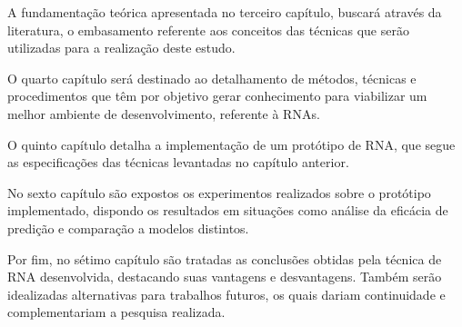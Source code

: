 A fundamentação teórica apresentada no terceiro capítulo, buscará através da literatura, o embasamento referente aos conceitos das técnicas que serão utilizadas para a realização deste estudo.

O quarto capítulo será destinado ao detalhamento de métodos, técnicas e procedimentos que têm por objetivo gerar conhecimento para viabilizar um melhor ambiente de desenvolvimento, referente à RNAs.

O quinto capítulo detalha a implementação de um protótipo de RNA, que segue as especificações das técnicas levantadas no capítulo anterior.

No sexto capítulo são expostos os experimentos realizados sobre o protótipo implementado, dispondo os resultados em situações como análise da eficácia de predição e comparação a modelos distintos.

Por fim, no sétimo capítulo são tratadas as conclusões obtidas pela técnica de RNA desenvolvida, destacando suas vantagens e desvantagens. Também serão idealizadas alternativas para trabalhos futuros, os quais dariam continuidade e complementariam a pesquisa realizada.


